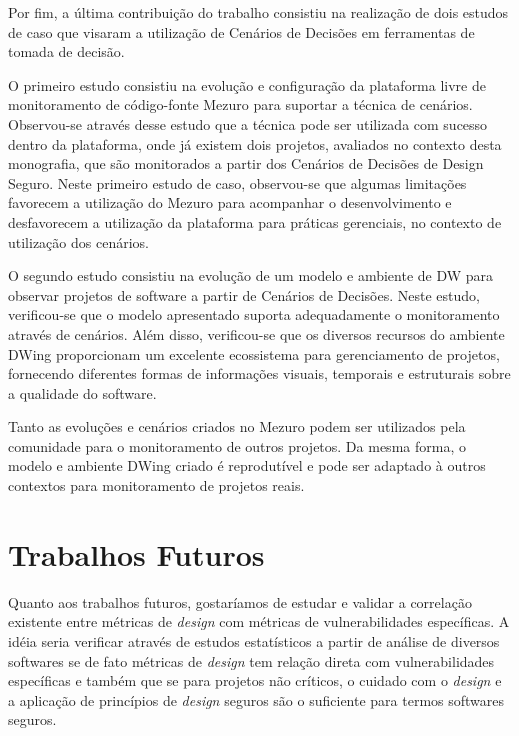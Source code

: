 %

Por fim, a última contribuição do trabalho consistiu na realização de dois estudos de caso que visaram a utilização de Cenários de Decisões em ferramentas de tomada de decisão. 

O primeiro estudo consistiu na evolução e configuração da plataforma livre de monitoramento de código-fonte Mezuro para suportar a técnica de cenários. Observou-se através desse estudo que a técnica pode ser utilizada com sucesso dentro da plataforma, onde já existem dois projetos, avaliados no contexto desta monografia, que são monitorados a partir dos Cenários de Decisões de Design Seguro. Neste primeiro estudo de caso, observou-se que algumas limitações favorecem a utilização do Mezuro para acompanhar o desenvolvimento e desfavorecem a utilização da plataforma para práticas gerenciais, no contexto de utilização dos cenários.

O segundo estudo consistiu na evolução de um modelo e ambiente de DW para observar projetos de software a partir de Cenários de Decisões. Neste estudo, verificou-se que o modelo apresentado suporta adequadamente o monitoramento através de cenários. Além disso, verificou-se que os diversos recursos do ambiente DWing proporcionam um excelente ecossistema para gerenciamento de projetos, fornecendo diferentes formas de informações visuais, temporais e estruturais sobre a qualidade do software. 

Tanto as evoluções e cenários criados no Mezuro podem ser utilizados pela comunidade para o monitoramento de outros projetos. Da mesma forma, o modelo e ambiente DWing criado é reprodutível e pode ser adaptado à outros contextos para monitoramento de projetos reais.





\section{Trabalhos Futuros}

Quanto aos trabalhos futuros, gostaríamos de estudar e validar a correlação existente entre métricas de \emph{design} com métricas de vulnerabilidades específicas. A idéia seria verificar através de estudos estatísticos a partir de análise de diversos softwares se de fato métricas de \emph{design} tem relação direta com vulnerabilidades específicas e também que se para projetos não críticos, o cuidado com o \emph{design} e a aplicação de princípios de \emph{design} seguros são o suficiente para termos softwares seguros. 

